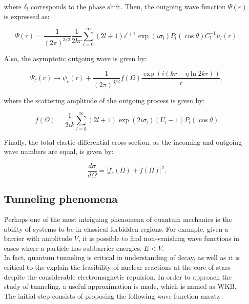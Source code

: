 \documentclass[openany]{book}
\begin{document}
where $\delta_l$ corresponds to the phase shift. Then, the outgoing wave function $\Psi(r)$ is expressed as:

\begin{equation}\label{rmatrix_coulombPsi_outgoing}
	\Psi(r) = \frac{1}{(2\pi)^{3/2}} \frac{1}{2kr} \sum_{l=0}^{\infty} {(2l + 1)i^{l+1} \exp {(i\sigma_l)} P_l(\cos \theta) C^{-1}_l u_l(r) }.
\end{equation}

Also, the asymptotic outgoing wave is given by: 

\begin{equation}\label{rmatrix_coulombPsi_outgoing_asymptotics}
	\Psi_c(r) \rightarrow  \psi_c(r) + \frac{1}{(2\pi)^{3/2}} f(\Omega) \frac{\exp {(i(kr - \eta \ln {2kr}))}}{r},
\end{equation}

where the scattering amplitude of the outgoing process is given by: 

\begin{equation}\label{rmatrix_coulombPsi_outgoing_scatteringAmplitude}
	f(\Omega) = \frac{1}{2ik} \sum_{l=0}^{\infty} {(2l+1)\exp {(2i\sigma_l) (U_l - 1)P_l(\cos \theta) }}
\end{equation}

Finally, the total elastic differential cross section, as the incoming and outgoing wave numbers are equal, is given by: 

\begin{equation}\label{rmatrix_coulombPsi_total_scatteringAmplitude}
	\frac{d\sigma}{d\Omega} = |f_c(\Omega) + f(\Omega)|^2.
\end{equation}



\subsection{Tunneling phenomena} \label{sub:tunnelingPhenomena}

Perhaps one of the most intriguing phenomena of quantum mechanics is the ability of systems to be in classical forbidden regions. For example, given a barrier with amplitude $V$, it is possible to find non-vanishing wave functions in cases where a particle has subbarrier energies, $E < V$. \\

In fact, quantum tunneling is critical in understanding of decay, as well as it is critical to the explain the feasibility of nuclear reactions at the core of stars despite the considerable electromagnetic repulsion. In order to approach the study of tunneling, a useful approximation is made, which is named as WKB.  The initial step consists of proposing the following wave function ansatz \cite{newton_2002}: 
\end{document}
